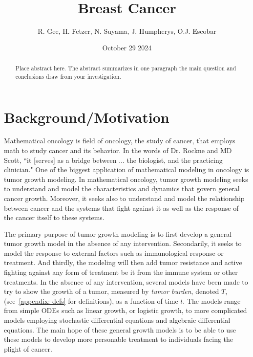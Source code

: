 \documentclass[11pt]{amsart}
\title{Breast Cancer}
\author{R. Gee, H. Fetzer, N. Suyama, J. Humpherys, O.J. Escobar}
\date{October 29 2024} %
\begin{document}
\maketitle %

\begin{abstract}
Place abstract here. The abstract summarizes in one paragraph the main question and conclusions draw from your investigation.
\end{abstract}

\section{Background/Motivation}

Mathematical oncology is field of oncology, the study of cancer, that employs math to study cancer and its behavior.
In the words of Dr. Rockne and MD Scott, ``it [serves] as a bridge between $\ldots$ the biologist, and the practicing clinician." \cite{IntroMathOnc}
One of the biggest application of mathematical modeling in oncology is tumor growth modeling.
In mathematical oncology, tumor growth modeling seeks to understand and model the characteristics and dynamics that govern general cancer growth.
Moreover, it seeks also to understand and model the relationship between cancer and the systems that fight against it as well as the response of the cancer itself to these systems.


The primary %
 purpose of tumor growth modeling is to first develop a general tumor growth model in the absence of any intervention.
Secondarily, it seeks to model the response to external factors such as immunological response or treatment. 
And thirdly, the modeling will then add tumor resistance and active fighting against any form of treatment be it from the immune system or other treatments.
In the absence of any intervention, several models have been made to try to show the growth of a tumor, measured by \textit{tumor burden}, denoted $T$, (see\ \ref{appendix: defs} for definitions), as a function of time $t$.
The models range from simple ODEs such as linear growth, or logistic growth, to more complicated models employing stochastic differential equations and algebraic differential equations. 
The main hope of these general growth models is to be able to use these models to develop more personable treatment to individuals facing the plight of cancer.\ \cite{YinMoes}
\end{document}
